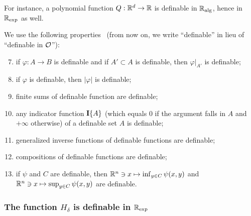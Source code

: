For  instance, a  polynomial function  $Q:\mathbb{R}^{d} \to  \mathbb{R}$ is  definable in
$\mathbb{R}_{\text{alg}}$, hence in $\mathbb{R}_{\exp}$ as well.

We use  the following  properties~\cite{attouch2013proximal} (from now  on, we
write ``definable'' in lieu of ``definable in $\mathcal{O}$''):
\begin{enumerate}[label=(\alph*)]
  \setcounter{enumi}{6}
\item\label{restrict} if $\varphi:A\to  B$ is definable and if  $A' \subset A$
  is definable, then $\varphi|_{A'}$ is definable;
\item\label{absval} if $\varphi$ is definable, then $|\varphi|$ is definable;
\item\label{finsum} finite sums of definable function are definable;
\item\label{indicator} any  indicator function  $\textbf{I}\{A\}$ (which equals  0 if
  the argument falls in $A$ and $+\infty$ otherwise) of a definable set $A$ is
  definable;
\item\label{inverse} generalized inverse functions  of definable functions are
  definable;
\item\label{compose} compositions of definable functions are definable;
\item\label{inf}    if     $\psi$    and     $C$    are     definable,    then
  $\mathbb{R}^{n}    \ni    x    \mapsto    \inf_{y   \in    C}    \psi(x,y)$    and
  $\mathbb{R}^{n} \ni x \mapsto \sup_{y \in C} \psi(x,y)$ are definable.
\end{enumerate}

\subsubsection{The   function   $H_{\delta}$  is   definable   in
  $\mathbb{R}_{\exp}$}

